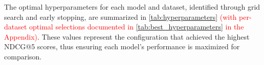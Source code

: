 %

\begin{table}[ht]
\centering
\begin{minipage}{\textwidth}
\begin{mmblock}
\caption{Evaluation results: mean$_{\pm \text{standard deviation}}$ over \RSseeds{}. Bold: best mean per dataset and metric. $^\dagger$KNN is deterministic (single run).}
\label{tab:evaluation_results}
\tiny
\setlength{\tabcolsep}{2pt} %

\end{mmblock}
\end{minipage}
\end{table}

The optimal hyperparameters for each model and dataset, identified through grid search and early stopping, are summarized in \textcolor{red}{\autoref{tab:hyperparameters} (with per-dataset optimal selections documented in \autoref{tab:best_hyperparameters} in the Appendix)}. These values represent the configuration that achieved the highest NDCG@5 scores, thus ensuring each model’s performance is maximized for comparison.

